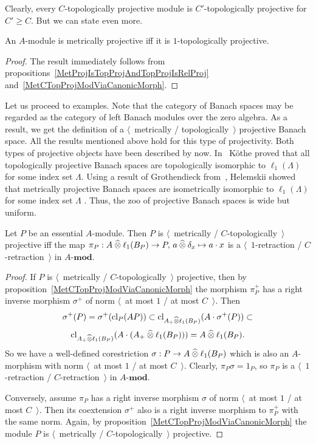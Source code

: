 Clearly, every $C$-topologically projective module is $C'$-topologically 
projective for $C'\geq C$. But we can state even more.

\begin{proposition}\label{MetProjIsOneTopProj} An $A$-module is metrically
projective iff it is $1$-topologically projective.
\end{proposition}
\begin{proof} The result immediately follows 
from propositions~\ref{MetProjIsTopProjAndTopProjIsRelProj} 
and~\ref{MetCTopProjModViaCanonicMorph}.
\end{proof}


Let us proceed to examples. Note that the category of Banach spaces may be
regarded as the category of left Banach modules over the zero algebra. As a
result, we get the definition of a $\langle$~metrically / topologically~$\rangle$
projective Banach space. All the results mentioned above hold for this type of
projectivity. Both types of projective objects have been described by now.
In~\cite{KotheTopProjBanSp} K{\"o}the proved that all topologically projective
Banach spaces are topologically isomorphic to $\ell_1(\Lambda)$ for some index
set $\Lambda$. Using a result of Grothendieck from~\cite{GrothMetrProjFlatBanSp},
Helemskii showed that metrically projective Banach spaces are isometrically
isomorphic to $\ell_1(\Lambda)$ for some index set $\Lambda$
\cite[proposition 3.2]{HelMetrFrQMod}. Thus, the zoo of projective Banach
spaces is wide but uniform.

\begin{proposition}\label{NonDegenMetTopProjCharac}  Let $P$ be an essential
$A$-module. Then $P$ is $\langle$~metrically / $C$-topologically~$\rangle$
projective iff the map 
$\pi_P:A\mathbin{\widehat{\otimes}}\ell_1(B_P)\to P,\, a\mathbin{\widehat{\otimes}}\delta_x\mapsto a\cdot x$ 
is a $\langle$~$1$-retraction / $C$-retraction~$\rangle$ in $A\text{-}\mathbf{mod}$.
\end{proposition} 
\begin{proof}
If $P$ is $\langle$~metrically / $C$-topologically~$\rangle$ projective, then by
proposition~\ref{MetCTopProjModViaCanonicMorph} the morphism 
$\pi_P^+$ has a right inverse morphism $\sigma^+$ of norm 
$\langle$~at most $1$ / at most $C$~$\rangle$. Then 
\[
\sigma^+(P)
=\sigma^+(\operatorname{cl}_P(AP))
\subset \operatorname{cl}_{A_+\mathbin{\widehat{\otimes}}\ell_1(B_P)}(A\cdot\sigma^+(P))\subset
\]
\[
\operatorname{cl}_{A_+\mathbin{\widehat{\otimes}}\ell_1(B_P)}(A\cdot(A_+\mathbin{\widehat{\otimes}}\ell_1(B_P)))
=A\mathbin{\widehat{\otimes}}\ell_1(B_P).
\] 
So we have a well-defined corestriction $\sigma:P\to A\mathbin{\widehat{\otimes}}\ell_1(B_P)$
which is also an $A$-morphism with norm $\langle$~at most $1$ / at most
$C$~$\rangle$. Clearly, $\pi_P\sigma=1_P$, so $\pi_P$ is a
$\langle$~$1$-retraction / $C$-retraction~$\rangle$ in $A\text{-}\mathbf{mod}$.

Conversely, assume $\pi_P$ has a right inverse morphism $\sigma$ of norm
$\langle$~at most $1$ / at most $C$~$\rangle$. Then its coextension $\sigma^+$
also is a right inverse morphism to $\pi_P^+$ with the same norm. Again, by
proposition~\ref{MetCTopProjModViaCanonicMorph} the module $P$ is
$\langle$~metrically / $C$-topologically~$\rangle$ projective. 
\end{proof}

